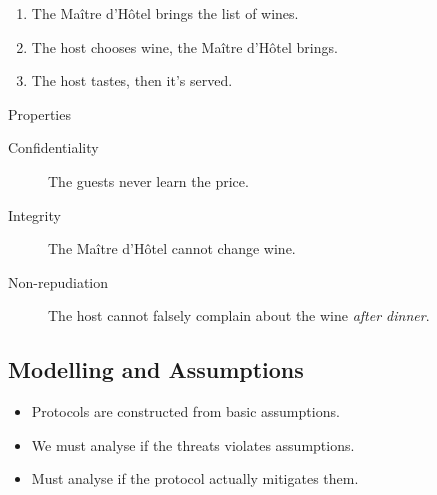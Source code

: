 \begin{frame}
  \begin{example}
    \begin{enumerate}
      \item The Maître d'Hôtel brings the list of wines.
      \item The host chooses wine, the Maître d'Hôtel brings.
      \item The host tastes, then it's served.
    \end{enumerate}
  \end{example}

  \pause

  \begin{block}{Properties}
    \begin{description}
      \item[Confidentiality] The guests never learn the price.
      \item[Integrity] The Maître d'Hôtel cannot change wine.
      \item[Non-repudiation] The host cannot falsely complain about the wine 
        \emph{after dinner}.
    \end{description}
  \end{block}
\end{frame}

\subsection{Modelling and Assumptions}

\begin{frame}
  \begin{remark}
    \begin{itemize}
      \item Protocols are constructed from basic assumptions.
      \item We must analyse if the threats violates assumptions.
      \item Must analyse if the protocol actually mitigates them.
    \end{itemize}
  \end{remark}
\end{frame}

